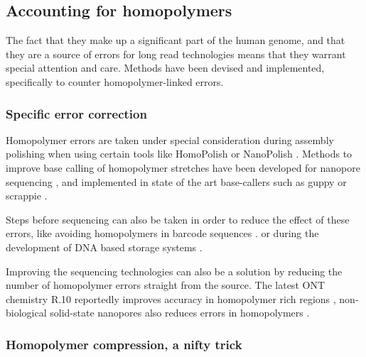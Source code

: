 \documentclass[
  11pt,
  twoside]{scrbook}
\begin{document}
\hypertarget{accounting-for-homopolymers}{%
\subsection{Accounting for homopolymers}\label{accounting-for-homopolymers}}

The fact that they make up a significant part of the human genome, and that they are a source of errors for long read technologies means that they warrant special attention and care. Methods have been devised and implemented, specifically to counter homopolymer-linked errors.

\hypertarget{specific-error-correction}{%
\subsubsection{Specific error correction}\label{specific-error-correction}}

Homopolymer errors are taken under special consideration during assembly polishing when using certain tools like HomoPolish \autocite{huangHomopolishMethodRemoval2021} or NanoPolish \autocite{simpsonDetectingDNACytosine2017}. Methods to improve base calling of homopolymer stretches have been developed for nanopore sequencing \autocite{rangSquiggleBasepairComputational2018,sarkozyCallingHomopolymerStretches2018}, and implemented in state of the art base-callers such as guppy or scrappie \autocite{wickPerformanceNeuralNetwork2019}.

Steps before sequencing can also be taken in order to reduce the effect of these errors, like avoiding homopolymers in barcode sequences \autocite{hawkinsIndelcorrectingDNABarcodes2018,srivathsanMinIONBasedPipeline2018}. or during the development of DNA based storage systems \autocite{wangConstructionBioConstrainedCode2019}.

Improving the sequencing technologies can also be a solution by reducing the number of homopolymer errors straight from the source. The latest ONT chemistry R.10 reportedly improves accuracy in homopolymer rich regions \autocite{R10NewestNanopore,amarasingheOpportunitiesChallengesLongread2020}, non-biological solid-state nanopores also reduces errors in homopolymers \autocite{zhouDetectionDNAHomopolymer2019,gotoIdentificationFourSinglestranded2018}.

\hypertarget{hpc-trick}{%
\subsubsection{Homopolymer compression, a nifty trick}\label{hpc-trick}}
\end{document}
